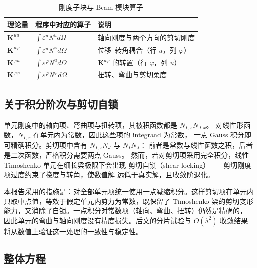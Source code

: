 \documentclass[UTF8,a4paper,11pt]{ctexart}
\newcommand{\bK}{\mathbf{K}}
\begin{document}
\begin{table}[H]
\centering
\caption{刚度子块与 Beam 模块算子}
\label{tab:operators}
\begin{tabular}{lll}
\toprule
理论量 & 程序中对应的算子 & 说明\\
\midrule
$\bK^{uu}$ & $\int\varepsilon^{u}N^{u}d\Omega$ & 轴向刚度与两个方向的剪切刚度\\
$\bK^{u\varphi}$ & $\int\varepsilon^{u}N^{\varphi}d\Omega$ & 位移--转角耦合（行 $u$，列 $\varphi$）\\
$\bK^{\varphi u}$ & $\int\varepsilon^{\varphi}N^{u}d\Omega$ & $\bK^{u\varphi}$ 的转置（行 $\varphi$，列 $u$）\\
$\bK^{\varphi\varphi}$ & $\int\varepsilon^{\varphi}N^{\varphi}d\Omega$ & 扭转、弯曲与剪切柔度\\
\bottomrule
\end{tabular}
\end{table}

\subsection{关于积分阶次与剪切自锁}

单元刚度中的轴向项、弯曲项与扭转项，其被积函数都是 $N_{I,x}N_{J,x}$。
对线性形函数，$N_{I,x}$ 在单元内为常数，因此这些项的 integrand 为常数，
一点 Gauss 积分即可精确积分。剪切项中含有 $N_{I,x}N_J$ 与 $N_IN_J$：
前者是常数与线性函数之积，后者是二次函数，严格积分需要两点 Gauss。
然而，若对剪切项采用完全积分，线性 Timoshenko 单元在细长梁极限下会出现
剪切自锁（shear locking）——剪切刚度项过度约束了挠度与转角，使数值解
远低于真实解，且收敛阶退化。

本报告采用的措施是：对全部单元项统一使用一点减缩积分。这样剪切项在单元内
只取中点值，等效于假定单元内剪力为常数，既保留了 Timoshenko 梁的剪切变形
能力，又消除了自锁。一点积分对常数项（轴向、弯曲、扭转）仍然是精确的，
因此单元的弯曲与轴向刚度没有精度损失。后文的分片试验与 $O(h^2)$ 收敛结果
将从数值上验证这一处理的一致性与稳定性。

\subsection{整体方程}
\end{document}
